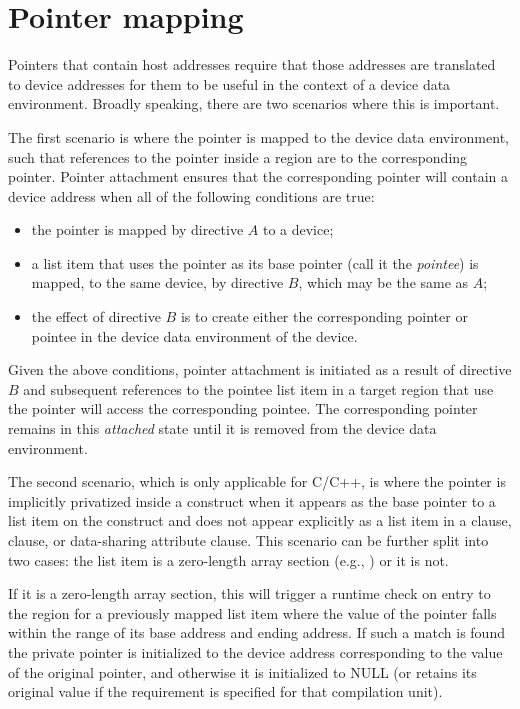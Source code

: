 \pagebreak
\section{Pointer mapping}
\label{sec:pointer_mapping}

Pointers that contain host addresses require that those addresses are translated to device addresses for them to be useful in the context of a device data environment. Broadly speaking, there are two scenarios where this is important.

The first scenario is where the pointer is mapped to the device data environment, such that references to the pointer inside a  region are to the corresponding pointer. Pointer attachment ensures that the corresponding pointer will contain a device address when all of the following conditions are true:
\begin{itemize}
 \item the pointer is mapped by directive $A$ to a device;
 \item a list item that uses the pointer as its base pointer (call it the \emph{pointee}) is mapped, to the same device, by directive $B$, which may be the same as $A$;
 \item the effect of directive $B$ is to create either the corresponding pointer or pointee in the device data environment of the device.
\end{itemize}

Given the above conditions, pointer attachment is initiated as a result of directive $B$ and subsequent references to the pointee list item in a target region that use the pointer will access the corresponding pointee. The corresponding pointer remains in this \emph{attached} state until it is removed from the device data environment.

The second scenario, which is only applicable for C/C++, is where the pointer is implicitly privatized inside a  construct when it appears as the base pointer to a list item on the construct and does not appear explicitly as a list item in a  clause,  clause, or data-sharing attribute clause. This scenario can be further split into two cases: the list item is a zero-length array section (e.g., ) or it is not.

If it is a zero-length array section, this will trigger a runtime check on entry to the  region for a previously mapped list item where the value of the pointer falls within the range of its base address and ending address. If such a match is found the private pointer is initialized to the device address corresponding to the value of the original pointer, and otherwise it is initialized to NULL (or retains its original value if the  requirement is specified for that compilation unit).


